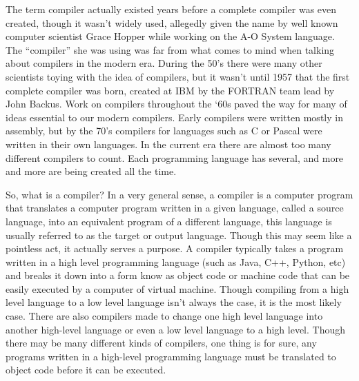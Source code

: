 \documentclass[12pt, oneside]{article}   	%
\begin{document}
The term compiler actually existed years before a complete compiler was
even created, though it wasn’t widely used, allegedly given the name by well
known computer scientist Grace Hopper while working on the A-O System
language. The “compiler” she was using was far from what comes to mind when
talking about compilers in the modern era. During the 50’s there were many other
scientists toying with the idea of compilers, but it wasn’t until 1957 that the first
complete compiler was born, created at IBM by the FORTRAN team lead by
John Backus. Work on compilers throughout the ‘60s paved the way for many of
ideas essential to our modern compilers. Early compilers were written mostly in
assembly, but by the 70’s compilers for languages such as C or Pascal were
written in their own languages. In the current era there are almost too many
different compilers to count. Each programming language has several, and more
and more are being created all the time.

So, what is a compiler? In a very general sense, a compiler is a computer
program that translates a computer program written in a given language, called a
source language, into an equivalent program of a different language, this
language is usually referred to as the target or output language. Though this may
seem like a pointless act, it actually serves a purpose. A compiler typically takes
a program written in a high level programming language (such as Java, C++,
Python, etc) and breaks it down into a form know as object code or machine code
that can be easily executed by a computer of virtual machine. Though compiling
from a high level language to a low level language isn’t always the case, it is
the most likely case. There are also compilers made to change one high level
language into another high-level language or even a low level language to a high
level. Though there may be many different kinds of compilers, one thing is for
sure, any programs written in a high-level programming language must be
translated to object code before it can be executed.
\end{document}
